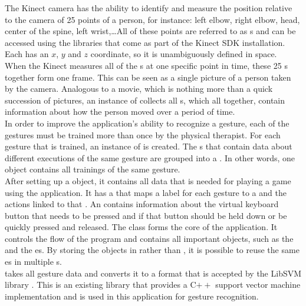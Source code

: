\newpage

The Kinect camera has the ability to identify and measure the position relative to the camera of 25 points of a person, for instance: left elbow, right elbow, head, center of the spine, left wrist,\ldots All of these points are referred to as s and can be accessed using the libraries that come as part of the Kinect SDK installation. Each  has an $x$, $y$ and $z$ coordinate, so it is unambiguously defined in space.\\

When the Kinect measures all of the s at one specific point in time, these 25 s together form one frame. This can be seen as a single picture of a person taken by the camera. Analogous to a movie, which is nothing more than a quick succession of pictures, an instance of  collects all s, which all together, contain information about how the person moved over a period of time.\\

In order to improve the application's ability to recognize a gesture, each of the gestures must be trained more than once by the physical therapist. For each gesture that is trained, an instance of  is created. The s that contain data about different executions of the same gesture are grouped into a . In other words, one  object contains all trainings of the same gesture.\\

After setting up a  object, it contains all data that is needed for playing a game using the application. It has a  that maps a label for each gesture to a  and the actions linked to that . An  contains information about the virtual keyboard button that needs to be pressed and if that button should be held down or be quickly pressed and released. The  class forms the core of the application. It controls the flow of the program and contains all important objects, such as the  and the es. By storing the  objects in  rather than , it is possible to reuse the same es in multiple s.\\

 takes all gesture data and converts it to a format that is accepted by the LibSVM library \cite{LibSVM}. This is an existing library that provides a C$++$ support vector machine implementation and is used in this application for gesture recognition.\\

